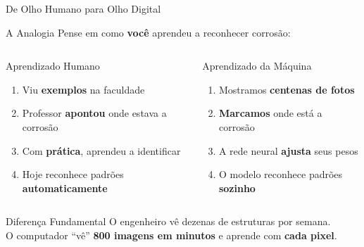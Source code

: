 \documentclass[aspectratio=169, 12pt]{beamer}
\begin{document}
\begin{frame}{De Olho Humano para Olho Digital}
    \begin{block}{A Analogia}
        Pense em como \textbf{você} aprendeu a reconhecer corrosão:
    \end{block}

    \vspace{0.2cm}

    \begin{columns}[T]
        \begin{block}{\faGraduationCap\hspace{0.2cm} Aprendizado Humano}
            \begin{enumerate}
                \item Viu \textbf{exemplos} na faculdade
                \item Professor \textbf{apontou} onde estava a corrosão
                \item Com \textbf{prática}, aprendeu a identificar
                \item Hoje reconhece padrões \textbf{automaticamente}
            \end{enumerate}
        \end{block}

        \begin{block}{\faRobot\hspace{0.2cm} Aprendizado da Máquina}
            \begin{enumerate}
                \item Mostramos \textbf{centenas de fotos}
                \item \textbf{Marcamos} onde está a corrosão
                \item A rede neural \textbf{ajusta} seus pesos
                \item O modelo reconhece padrões \textbf{sozinho}
            \end{enumerate}
        \end{block}
    \end{columns}

    \vspace{0.4cm}

    \begin{alertblock}{Diferença Fundamental}
        O engenheiro vê dezenas de estruturas por semana.\\
        O computador ``vê'' \textbf{800 imagens em minutos} e aprende com \textbf{cada pixel}.
    \end{alertblock}
\end{frame}
\end{document}
